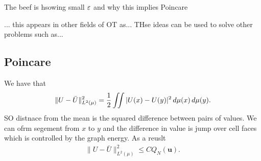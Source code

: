 \documentclass[
    a4paper,
    DIV=13,
    abstract=true,
    numbers=noenddot
]{scrartcl}
\begin{document}
The beef is hsowing small $\varepsilon$ and why this implies Poincare

... this appears in other fields of OT as... THse ideas can be used to solve other problems such as...

\subsection{Poincare}
We have that
\begin{align*}
\|U-\bar U\|_{L^2(\mu)}^2=\frac12\iint|U(x)-U(y)|^2\thinspace d\mu(x)\thinspace d\mu(y).
\end{align*}
SO distnace from the mean is the squared difference between pairs of values. We can ofrm segement from $x$ to $y$ and the difference in value is jump over cell faces which is controlled by the graph energy. As a reuslt
\begin{align*}
\|U-\bar U\|_{L^2(\mu)}^2\le C Q_N(\mathbf u).
\end{align*}
\end{document}
